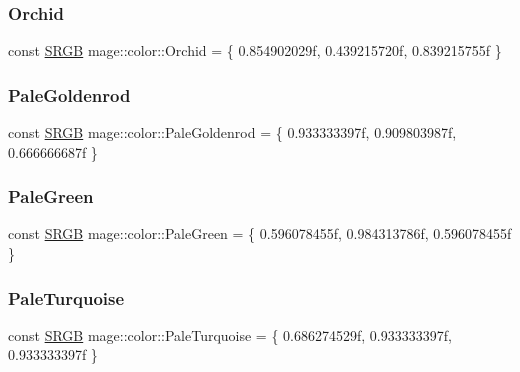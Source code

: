 \hypertarget{namespacemage_1_1color_a47cd4ebcaa73248f12a128697acdbad1}{}\label{namespacemage_1_1color_a47cd4ebcaa73248f12a128697acdbad1} 
\subsubsection{\texorpdfstring{Orchid}{Orchid}}
{\footnotesize\ttfamily const \hyperlink{structmage_1_1_s_r_g_b}{S\+R\+GB} mage\+::color\+::\+Orchid = \{ 0.\+854902029f, 0.\+439215720f, 0.\+839215755f \}}

\hypertarget{namespacemage_1_1color_a7b6ab88abd4fff6d1214cbf75c2d7488}{}\label{namespacemage_1_1color_a7b6ab88abd4fff6d1214cbf75c2d7488} 
\subsubsection{\texorpdfstring{Pale\+Goldenrod}{PaleGoldenrod}}
{\footnotesize\ttfamily const \hyperlink{structmage_1_1_s_r_g_b}{S\+R\+GB} mage\+::color\+::\+Pale\+Goldenrod = \{ 0.\+933333397f, 0.\+909803987f, 0.\+666666687f \}}

\hypertarget{namespacemage_1_1color_aeaa7f046f3b3964e4c414dca62a79a77}{}\label{namespacemage_1_1color_aeaa7f046f3b3964e4c414dca62a79a77} 
\subsubsection{\texorpdfstring{Pale\+Green}{PaleGreen}}
{\footnotesize\ttfamily const \hyperlink{structmage_1_1_s_r_g_b}{S\+R\+GB} mage\+::color\+::\+Pale\+Green = \{ 0.\+596078455f, 0.\+984313786f, 0.\+596078455f \}}

\hypertarget{namespacemage_1_1color_a6ca78d299bf64a69174e212632942c81}{}\label{namespacemage_1_1color_a6ca78d299bf64a69174e212632942c81} 
\subsubsection{\texorpdfstring{Pale\+Turquoise}{PaleTurquoise}}
{\footnotesize\ttfamily const \hyperlink{structmage_1_1_s_r_g_b}{S\+R\+GB} mage\+::color\+::\+Pale\+Turquoise = \{ 0.\+686274529f, 0.\+933333397f, 0.\+933333397f \}}

